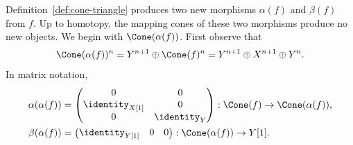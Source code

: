 Definition~\ref{def:cone-triangle} produces two new morphisms $\alpha(f)$ and
$\beta(f)$ from $f$. Up to homotopy, the mapping cones of these two morphisms
produce no new objects. We begin with $\Cone(\alpha(f))$. First observe that
\[ \Cone(\alpha(f))^n = Y^{n+1} \oplus \Cone(f)^n = Y^{n+1} \oplus X^{n+1} \oplus Y^n. \]
In matrix notation,
\begin{align*}
	\alpha(\alpha(f)) & = \begin{pmatrix}
		0 & 0 \\
		\identity_{X[1]} & 0 \\
		0 & \identity_Y
	\end{pmatrix} : \Cone(f) \to \Cone(\alpha(f)) , \\
	\beta(\alpha(f)) & = \begin{pmatrix}
		\identity_{Y[1]} & 0 & 0
	\end{pmatrix} : \Cone(\alpha(f)) \to Y[1].
\end{align*}


